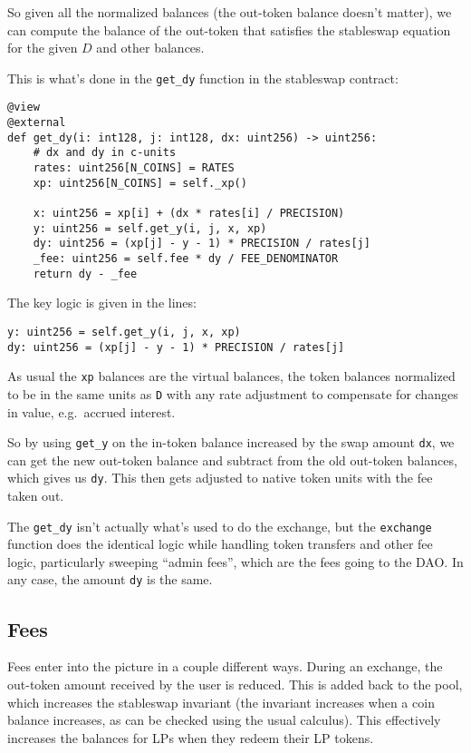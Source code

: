 \documentclass[
]{article}
\begin{document}
So given all the normalized balances (the out-token balance doesn't
matter), we can compute the balance of the out-token that satisfies the
stableswap equation for the given \(D\) and other balances.

This is what's done in the \texttt{get\_dy} function in the stableswap
contract:

\begin{verbatim}
@view
@external
def get_dy(i: int128, j: int128, dx: uint256) -> uint256:
    # dx and dy in c-units
    rates: uint256[N_COINS] = RATES
    xp: uint256[N_COINS] = self._xp()

    x: uint256 = xp[i] + (dx * rates[i] / PRECISION)
    y: uint256 = self.get_y(i, j, x, xp)
    dy: uint256 = (xp[j] - y - 1) * PRECISION / rates[j]
    _fee: uint256 = self.fee * dy / FEE_DENOMINATOR
    return dy - _fee
\end{verbatim}

The key logic is given in the lines:

\begin{verbatim}
y: uint256 = self.get_y(i, j, x, xp)
dy: uint256 = (xp[j] - y - 1) * PRECISION / rates[j]
\end{verbatim}

As usual the \texttt{xp} balances are the virtual balances, the token
balances normalized to be in the same units as \texttt{D} with any rate
adjustment to compensate for changes in value, e.g.~accrued interest.

So by using \texttt{get\_y} on the in-token balance increased by the
swap amount \texttt{dx}, we can get the new out-token balance and
subtract from the old out-token balances, which gives us \texttt{dy}.
This then gets adjusted to native token units with the fee taken out.

The \texttt{get\_dy} isn't actually what's used to do the exchange, but
the \texttt{exchange} function does the identical logic while handling
token transfers and other fee logic, particularly sweeping ``admin
fees'', which are the fees going to the DAO. In any case, the amount
\texttt{dy} is the same.

\hypertarget{fees}{%
\subsection{Fees}\label{fees}}

Fees enter into the picture in a couple different ways. During an
exchange, the out-token amount received by the user is reduced. This is
added back to the pool, which increases the stableswap invariant (the
invariant increases when a coin balance increases, as can be checked
using the usual calculus). This effectively increases the balances for
LPs when they redeem their LP tokens.
\end{document}
